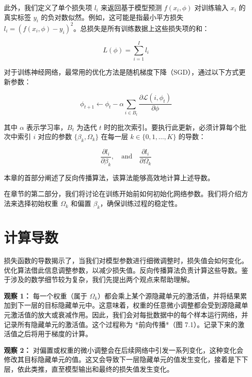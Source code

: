 \documentclass[lang=cn,newtx,10pt,scheme=chinese]{elegantbook}
\begin{document}
此外，我们定义了单个损失项 \(l_i\) 来返回基于模型预测 \(f(x_i, \phi)\) 对训练输入 \(x_i\) 的真实标签 \(y_i\) 的负对数似然。例如，这可能是指最小平方损失 \(l_i = (f(x_i, \phi) - y_i)^2\)。总损失是所有训练数据上这些损失项的和：

\begin{equation}
L(\phi) = \sum_{i=1}^{I} l_i 
\end{equation}

对于训练神经网络，最常用的优化方法是随机梯度下降（SGD），通过以下方式更新参数：

\begin{equation}
\phi_{t+1} \leftarrow \phi_t - \alpha \sum_{i \in B_t} \frac{\partial \mathcal{L}(i,\phi_t)}{\partial \phi} 
\end{equation}

其中 \(\alpha\) 表示学习率，\(B_t\) 为迭代 \(t\) 时的批次索引。要执行此更新，必须计算每个批次中索引 \(i\) 对应的参数 \(\{\beta_k, \Omega_k\}\) 在每一层 \(k \in \{0, 1, \ldots, K\}\) 的导数：

\begin{equation}
\frac{\partial l_i}{\partial \beta_k}, \quad \text{and} \quad \frac{\partial l_i}{\partial \Omega_k} 
\end{equation}

本章的首部分阐述了反向传播算法，该算法能够高效地计算上述导数。

在章节的第二部分，我们将讨论在训练开始前如何初始化网络参数。我们将介绍方法来选择初始权重 \(\Omega_k\) 和偏置 \(\beta_k\)，确保训练过程的稳定性。
\section{计算导数}

损失函数的导数揭示了，当我们对模型参数进行细微调整时，损失值会如何变化。优化算法借此信息调整参数，以减少损失值。反向传播算法负责计算这些导数。鉴于涉及的数学细节较为复杂，我们先提出两个观点来帮助理解。

\textbf{观察 1：} 每一个权重（属于 \(\Omega_k\)）都会乘上某个源隐藏单元的激活值，并将结果累加到下一层的目标隐藏单元中。这意味着，权重的任意微小调整都会受到源隐藏单元激活值的放大或衰减作用。因此，我们会对每批数据中的每个样本运行网络，并记录所有隐藏单元的激活值。这个过程称为 *前向传播*（图 7.1）。记录下来的激活值之后将用于梯度的计算。

\textbf{观察 2：} 对偏置或权重的微小调整会在后续网络中引发一系列变化，这种变化会修改其目标隐藏单元的值。这又会导致下一层隐藏单元的值发生变化，接着是下下层，依此类推，直至模型输出和最终的损失值发生变化。
\end{document}
